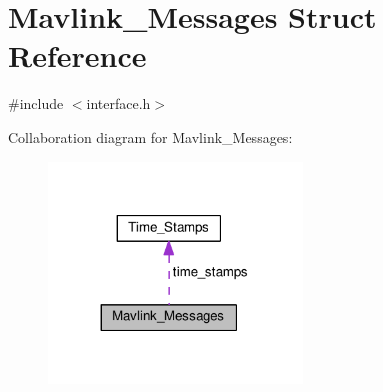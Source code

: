 \hypertarget{struct_mavlink___messages}{}\section{Mavlink\+\_\+\+Messages Struct Reference}
\label{struct_mavlink___messages}


{\ttfamily \#include $<$interface.\+h$>$}



Collaboration diagram for Mavlink\+\_\+\+Messages\+:
\nopagebreak
\begin{figure}[H]
\begin{center}
\leavevmode
\includegraphics[width=191pt]{struct_mavlink___messages__coll__graph}
\end{center}
\end{figure}
